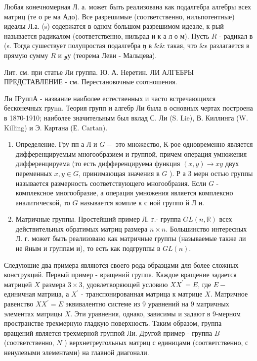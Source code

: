 \documentclass[10pt]{article}
\begin{document}
Любая конечномерная Л. а. может быть реализована как подалгебра алгебры всех матриц (те о ре ма Адо). Все разрешимые (соответственно, нильпотентные) идеалы Л.а. (s) содержатся в одном большом разрешимом идеале, к-рый называется радикалом (соответственно, нильрад и к а л о м). Пусть $R$ - радикал в (s. Тогда сушествует полупростая подалгебра $\mathfrak{y}$ в \&\& такая, что \&s разлагается в прямую сумму $R$ и وу (теорема Леви - Мальцева).



Лит. см. при статье Ли группа. Ю. А. Неретин. ЛИ АЛГЕБРЫ ПРЕДСТАВЛЕНИЕ - см. Перестановочные соотношения.



Ли IPуппА - название наиболее естественных и часто встречающихся бесконечных груnn. Теория групп и алгебр Ли была в основных чертах построена в 1870-1910; наиболее значительным был вклад С. Ли (S. Lie), В. Киллинга (W. Killing) и Э. Картана (Е. Cartan).



\begin{enumerate}

  \item Определение. Гру пп а Л и $G-$ это множество, К-рое одновременно является дифференцируемым многообразием и группой, причем операция умножения дифференцируема (то есть дифференцируема функция $(x, y) \rightarrow x y$ двух переменных $x, y \in G$, принимающая значения в $G$ ). Р а 3 мерн остью группы называется размерность соответствующего многообразия. Если $G$ - комплексное многообразие, а операция умножения является комплексно аналитической, то $G$ называется компле к с ной группо й Л и.



  \item Матричные группы. Простейший пример Л. г.- группа $G L(n, \mathbb{R})$ всех действительных обратимых матриц размера $n \times n$. Большинство интересных Л. г. может быть реализовано как матричные группы (называемые также ли не йным и группам и), то есть как подгруппы в $G L(n)$.



\end{enumerate}



Следуюшие два примера являются своего рода образцами для более сложных конструкций. Первый пример - вращений группа. Каждое вращение задается матрицей $X$ размера $3 \times 3$, удовлетворяющей условию $X X^{\prime}=E$, где $E-$ единичная матрица, а $X^{\prime}$ - транспонированная матрица к матрице $X$. Матричное равенство $X X^{\prime}=E$ эквивалентно системе из 9 уравнений на 9 матричных элементах матрицы $X$. Эти уравнения, однако, зависимы и задают в 9-мерном пространстве трехмерную гладкую поверхность. Таким образом, группа вращений является трехмерной группой Ли. Другой пример - группа $B$ (соответственно, $N$ ) верхнетреугольных матриц с единицами (соответственно, с ненулевыми элементами) на главной диагонали.
\end{document}
